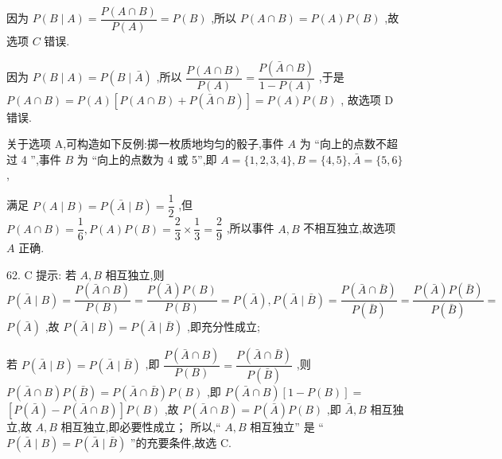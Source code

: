 因为 $P\left( {B \mid  A}\right)  = \dfrac{P\left( {A \cap  B}\right) }{P\left( A\right) } = P\left( B\right)$ ,所以 $P\left( {A \cap  B}\right)  = P\left( A\right) P\left( B\right)$ ,故选项 $C$ 错误.

因为 $P\left( {B \mid  A}\right)  = P\left( {B \mid  \bar{A}}\right)$ ,所以 $\dfrac{P\left( {A \cap  B}\right) }{P\left( A\right) } = \dfrac{P\left( {\bar{A} \cap  B}\right) }{1 - P\left( A\right) }$ ,于是 $P\left( {A \cap  B}\right)  = P\left( A\right) \left\lbrack  {P\left( {A \cap  B}\right)  + P\left( {\bar{A} \cap  B}\right) }\right\rbrack   = P\left( A\right) P\left( B\right)$ , 故选项 D 错误.

关于选项 A,可构造如下反例:掷一枚质地均匀的骰子,事件 $A$ 为 “向上的点数不超过 4 ”,事件 $B$ 为 “向上的点数为 4 或 5”,即 $A = \{ 1,2,3,4\} ,B = \{ 4,5\} ,\bar{A} = \{ 5,6\}$ ,

满足 $P\left( {A \mid  B}\right)  = P\left( {\bar{A} \mid  B}\right)  = \dfrac{1}{2}$ ,但 $P\left( {A \cap  B}\right)  = \dfrac{1}{6},P\left( A\right) P\left( B\right)  = \dfrac{2}{3} \times  \dfrac{1}{3} = \dfrac{2}{9}$ ,所以事件 $A,B$ 不相互独立,故选项 $A$ 正确.

62. C 提示: 若 $A,B$ 相互独立,则 $P\left( {\bar{A} \mid  B}\right)  = \dfrac{P\left( {\bar{A} \cap  B}\right) }{P\left( B\right) } = \dfrac{P\left( \bar{A}\right) P\left( B\right) }{P\left( B\right) } = P\left( \bar{A}\right) ,P\left( {\bar{A} \mid  \bar{B}}\right)  = \dfrac{P\left( {\bar{A} \cap  \bar{B}}\right) }{P\left( \bar{B}\right) } = \dfrac{P\left( \bar{A}\right) P\left( \bar{B}\right) }{P\left( \bar{B}\right) } =$  $P\left( \bar{A}\right)$ ,故 $P\left( {\bar{A} \mid  B}\right)  = P\left( {\bar{A} \mid  \bar{B}}\right)$ ,即充分性成立;

若 $P\left( {\bar{A} \mid  B}\right)  = P\left( {\bar{A} \mid  \bar{B}}\right)$ ,即 $\dfrac{P\left( {\bar{A} \cap  B}\right) }{P\left( B\right) } = \dfrac{P\left( {\bar{A} \cap  \bar{B}}\right) }{P\left( \bar{B}\right) }$ ,则 $P\left( {\bar{A} \cap  B}\right) P\left( \bar{B}\right)  = P\left( {\bar{A} \cap  \bar{B}}\right) P\left( B\right)$ ,即 $P\left( {\bar{A} \cap  B}\right) \left\lbrack  {1 - P\left( B\right) }\right\rbrack   =$  $\left\lbrack  {P\left( \bar{A}\right)  - P\left( {\bar{A} \cap  B}\right) }\right\rbrack  P\left( B\right)$ ,故 $P\left( {\bar{A} \cap  B}\right)  = P\left( \bar{A}\right) P\left( B\right)$ ,即 $\bar{A},B$ 相互独立,故 $A,B$ 相互独立,即必要性成立； 所以,“ $A,B$ 相互独立” 是 “ $P\left( {\bar{A} \mid  B}\right)  = P\left( {\bar{A} \mid  \bar{B}}\right)$ ”的充要条件,故选 C.

